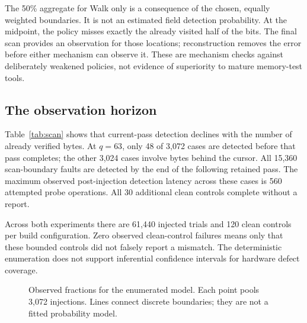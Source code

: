 \documentclass[10pt,twocolumn,letterpaper]{article}
\begin{document}
\begin{table}[t]
\centering\small
\caption{Experiment 1: detections out of 3,072 injections per cell. $k$ is the number of completed bit visits.}
\label{tab:walk}

\end{table}

The 50\% aggregate for Walk only is a consequence of the chosen, equally weighted boundaries. It is not an estimated field detection probability. At the midpoint, the policy misses exactly the already visited half of the bits. The final scan provides an observation for those locations; reconstruction removes the error before either mechanism can observe it. These are mechanism checks against deliberately weakened policies, not evidence of superiority to mature memory-test tools.

\subsection{The observation horizon}
Table~\ref{tab:scan} shows that current-pass detection declines with the number of already verified bytes. At $q=63$, only 48 of 3,072 cases are detected before that pass completes; the other 3,024 cases involve bytes behind the cursor. All 15,360 scan-boundary faults are detected by the end of the following retained pass. The maximum observed post-injection detection latency across these cases is 560 attempted probe operations. All 30 additional clean controls complete without a report.

\begin{table}[t]
\centering\small
\caption{Experiment 2: detections out of 3,072 injections per row. The following-pass column includes earlier detections.}
\label{tab:scan}

\end{table}

Across both experiments there are 61,440 injected trials and 120 clean controls per build configuration. Zero observed clean-control failures means only that these bounded controls did not falsely report a mismatch. The deterministic enumeration does not support inferential confidence intervals for hardware defect coverage.

\begin{figure}[t]
\centering

\caption{Observed fractions for the enumerated model. Each point pools 3,072 injections. Lines connect discrete boundaries; they are not a fitted probability model.}
\label{fig:results}
\end{figure}
\end{document}
